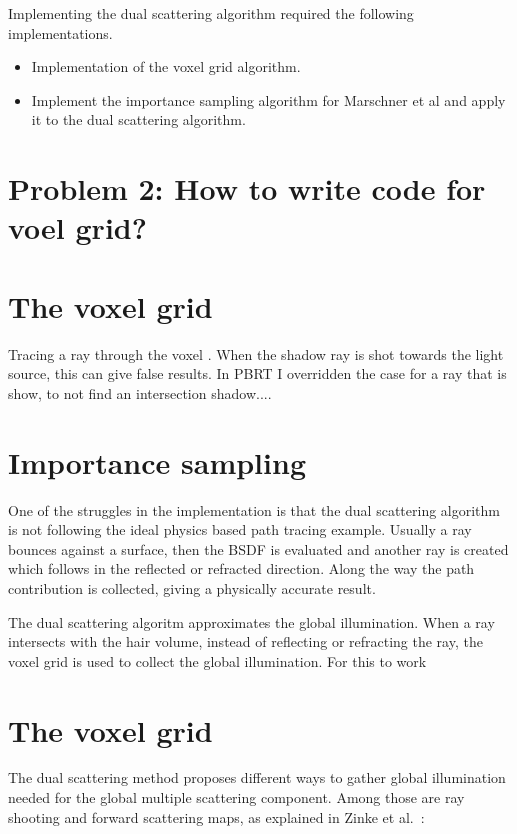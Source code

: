 \documentclass[11pt,a4paper]{report}
\begin{document}
Implementing the dual scattering algorithm required the following implementations.

\begin{itemize}
\item Implementation of the voxel grid algorithm.
\item Implement the importance sampling algorithm for Marschner et al and apply it to the dual scattering algorithm.
\end{itemize}

\section{Problem 2: How to write code for voel grid?}
\section{The voxel grid}

Tracing a ray through the voxel . When the shadow ray is shot towards the light source, this can give false results. In PBRT I overridden the case for a ray that is show, to not find an intersection shadow....

\section{Importance sampling}

One of the struggles in the implementation is that the dual scattering algorithm is not following the ideal physics based path tracing example. Usually a ray bounces against a surface, then the BSDF is evaluated and another ray is created which follows in the reflected or refracted direction. Along the way the path contribution is collected, giving a physically accurate result.

The dual scattering algoritm approximates the global illumination. When a ray intersects with the hair volume, instead of reflecting or refracting the ray, the voxel grid is used to collect the global illumination. For this to work




\section{The voxel grid}

The dual scattering method proposes different ways to gather global illumination needed for the global multiple scattering component. Among those are ray shooting and forward scattering maps, as explained in Zinke et al.~\cite{zinke}:
\end{document}

